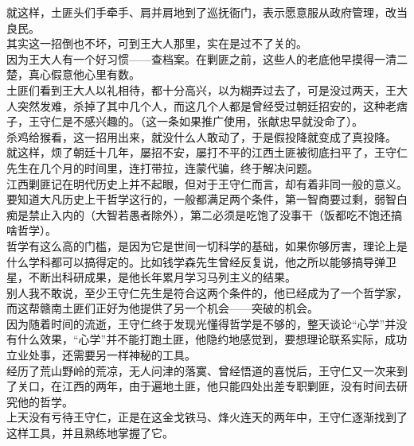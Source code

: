 \begin{multicols}{\theparacolNo}
就这样，土匪头们手牵手、肩并肩地到了巡抚衙门，表示愿意服从政府管理，改当良民。\\

其实这一招倒也不坏，可到王大人那里，实在是过不了关的。\\

因为王大人有一个好习惯——查档案。在剿匪之前，这些人的老底他早摸得一清二楚，真心假意他心里有数。\\

土匪们看到王大人以礼相待，都十分高兴，以为糊弄过去了，可是没过两天，王大人突然发难，杀掉了其中几个人，而这几个人都是曾经受过朝廷招安的，这种老痞子，王守仁是不感兴趣的。（这一条如果推广使用，张献忠早就没命了）。\\

杀鸡给猴看，这一招用出来，就没什么人敢动了，于是假投降就变成了真投降。\\

就这样，烦了朝廷十几年，屡招不安，屡打不平的江西土匪被彻底扫平了，王守仁先生在几个月的时间里，连打带拉，连蒙代骗，终于解决问题。\\

江西剿匪记在明代历史上并不起眼，但对于王守仁而言，却有着非同一般的意义。\\

要知道大凡历史上干哲学这行的，一般都满足两个条件，第一智商要过剩，弱智白痴是禁止入内的（大智若愚者除外），第二必须是吃饱了没事干（饭都吃不饱还搞啥哲学）。\\

哲学有这么高的门槛，是因为它是世间一切科学的基础，如果你够厉害，理论上是什么学科都可以搞得定的。比如钱学森先生曾经反复说，他之所以能够搞导弹卫星，不断出科研成果，是他长年累月学习马列主义的结果。\\

别人我不敢说，至少王守仁先生是符合这两个条件的，他已经成为了一个哲学家，而这帮赣南土匪们正好为他提供了另一个机会——突破的机会。\\

因为随着时间的流逝，王守仁终于发现光懂得哲学是不够的，整天谈论“心学”并没有什么效果，“心学”并不能打跑土匪，他隐约地感觉到，要想理论联系实际，成功立业处事，还需要另一样神秘的工具。\\

经历了荒山野岭的荒凉，无人问津的落寞、曾经悟道的喜悦后，王守仁又一次来到了关口，在江西的两年，由于遍地土匪，他只能四处出差专职剿匪，没有时间去研究他的哲学。\\

上天没有亏待王守仁，正是在这金戈铁马、烽火连天的两年中，王守仁逐渐找到了这样工具，并且熟练地掌握了它。\\


\end{multicols}
